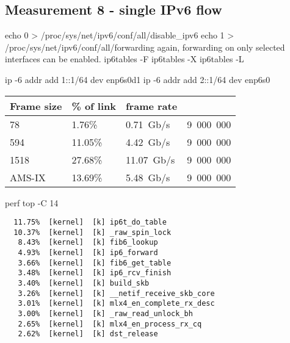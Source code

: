 
\subsection{Measurement 8 - single IPv6 flow}

echo 0 > /proc/sys/net/ipv6/conf/all/disable\_ipv6
echo 1 > /proc/sys/net/ipv6/conf/all/forwarding
again, forwarding on only selected interfaces can be enabled.
ip6tables -F
ip6tables -X
ip6tables -L

ip -6 addr add 1::1/64 dev enp6s0d1
ip -6 addr add 2::1/64 dev enp6s0



\begin{tabular}{ | l | l | l | l | }
\hline
Frame size & \% of link & frame rate \\
\hline
78     &  1.76\% &  0.71~Gb/s & 9~000~000 \\
594    & 11.05\% &  4.42~Gb/s & 9~000~000 \\
1518   & 27.68\% & 11.07~Gb/s & 9~000~000 \\
AMS-IX & 13.69\% &  5.48~Gb/s & 9~000~000 \\
\hline
\end{tabular}

perf top -C 14
\begin{lstlisting}
  11.75%  [kernel]  [k] ip6t_do_table
  10.37%  [kernel]  [k] _raw_spin_lock
   8.43%  [kernel]  [k] fib6_lookup
   4.93%  [kernel]  [k] ip6_forward
   3.66%  [kernel]  [k] fib6_get_table
   3.48%  [kernel]  [k] ip6_rcv_finish
   3.40%  [kernel]  [k] build_skb
   3.26%  [kernel]  [k] __netif_receive_skb_core
   3.01%  [kernel]  [k] mlx4_en_complete_rx_desc
   3.00%  [kernel]  [k] _raw_read_unlock_bh
   2.65%  [kernel]  [k] mlx4_en_process_rx_cq
   2.62%  [kernel]  [k] dst_release
\end{lstlisting}

